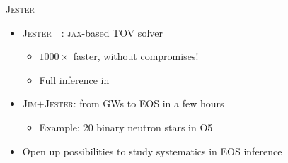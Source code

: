 \documentclass[usenames,dvipsnames,t]{beamer}
\newcommand{\ghlink}[1]{\href{https://github.com/#1}{\textcolor{black}{\faGithub}}}
\begin{document}
\begin{frame}{\textsc{Jester}}
  \def\x{2mm}

  \begin{itemize}
    \item \textsc{Jester}~\ghlink{nuclear-multimessenger-astronomy/jester}~\cite{Wouters:2025zju}: \textsc{jax}-based TOV solver
    \begin{itemize}
      \item $1000\times$ faster, without compromises!
      \item Full inference in 
    \end{itemize}

    \vspace{\x}

    \item<2-> \textsc{Jim}$+$\textsc{Jester}: from GWs to EOS in a few hours
    \begin{itemize}
      \item Example: 20 binary neutron stars in O5
    \end{itemize}

    \vspace{\x}
    
    \item<2-> Open up possibilities to study systematics in EOS inference
  \end{itemize}

  \vspace{-3mm}

  \begin{columns}


\end{columns}
\end{frame}
\end{document}
